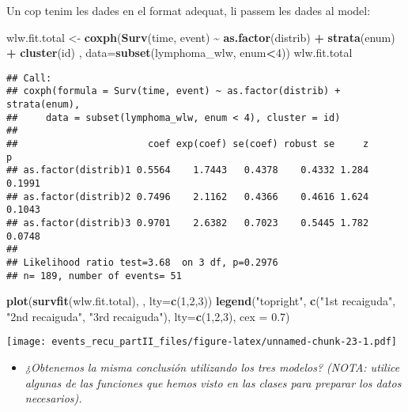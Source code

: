 \documentclass[
]{article}
\newenvironment{Shaded}{\begin{snugshade}}{\end{snugshade}}
\newcommand{\AttributeTok}[1]{\textcolor[rgb]{0.13,0.29,0.53}{#1}}
\newcommand{\DecValTok}[1]{\textcolor[rgb]{0.00,0.00,0.81}{#1}}
\newcommand{\FloatTok}[1]{\textcolor[rgb]{0.00,0.00,0.81}{#1}}
\newcommand{\FunctionTok}[1]{\textcolor[rgb]{0.13,0.29,0.53}{\textbf{#1}}}
\newcommand{\NormalTok}[1]{#1}
\newcommand{\OtherTok}[1]{\textcolor[rgb]{0.56,0.35,0.01}{#1}}
\newcommand{\SpecialCharTok}[1]{\textcolor[rgb]{0.81,0.36,0.00}{\textbf{#1}}}
\newcommand{\StringTok}[1]{\textcolor[rgb]{0.31,0.60,0.02}{#1}}
\providecommand{\tightlist}{%
  \setlength{\itemsep}{0pt}\setlength{\parskip}{0pt}}
\begin{document}
Un cop tenim les dades en el format adequat, li passem les dades al
model:

\begin{Shaded}
\begin{Highlighting}[]
\NormalTok{wlw.fit.total }\OtherTok{\textless{}{-}} \FunctionTok{coxph}\NormalTok{(}\FunctionTok{Surv}\NormalTok{(time, event) }\SpecialCharTok{\textasciitilde{}} \FunctionTok{as.factor}\NormalTok{(distrib) }\SpecialCharTok{+} \FunctionTok{strata}\NormalTok{(enum) }\SpecialCharTok{+}
                  \FunctionTok{cluster}\NormalTok{(id) , }\AttributeTok{data=}\FunctionTok{subset}\NormalTok{(lymphoma\_wlw, enum}\SpecialCharTok{\textless{}}\DecValTok{4}\NormalTok{))}
\NormalTok{wlw.fit.total}
\end{Highlighting}
\end{Shaded}

\begin{verbatim}
## Call:
## coxph(formula = Surv(time, event) ~ as.factor(distrib) + strata(enum), 
##     data = subset(lymphoma_wlw, enum < 4), cluster = id)
## 
##                       coef exp(coef) se(coef) robust se     z      p
## as.factor(distrib)1 0.5564    1.7443   0.4378    0.4332 1.284 0.1991
## as.factor(distrib)2 0.7496    2.1162   0.4366    0.4616 1.624 0.1043
## as.factor(distrib)3 0.9701    2.6382   0.7023    0.5445 1.782 0.0748
## 
## Likelihood ratio test=3.68  on 3 df, p=0.2976
## n= 189, number of events= 51
\end{verbatim}

\begin{Shaded}
\begin{Highlighting}[]
\FunctionTok{plot}\NormalTok{(}\FunctionTok{survfit}\NormalTok{(wlw.fit.total), , }\AttributeTok{lty=}\FunctionTok{c}\NormalTok{(}\DecValTok{1}\NormalTok{,}\DecValTok{2}\NormalTok{,}\DecValTok{3}\NormalTok{)) }
\FunctionTok{legend}\NormalTok{(}\StringTok{"topright"}\NormalTok{, }\FunctionTok{c}\NormalTok{(}\StringTok{"1st recaiguda"}\NormalTok{, }\StringTok{"2nd recaiguda"}\NormalTok{, }\StringTok{"3rd recaiguda"}\NormalTok{), }\AttributeTok{lty=}\FunctionTok{c}\NormalTok{(}\DecValTok{1}\NormalTok{,}\DecValTok{2}\NormalTok{,}\DecValTok{3}\NormalTok{), }\AttributeTok{cex =} \FloatTok{0.7}\NormalTok{)}
\end{Highlighting}
\end{Shaded}

\texttt{[image: events\_recu\_partII\_files/figure-latex/unnamed-chunk-23-1.pdf]}

\begin{itemize}
\tightlist
\item
  \emph{¿Obtenemos la misma conclusión utilizando los tres modelos?
  (NOTA: utilice algunas de las funciones que hemos visto en las clases
  para preparar los datos necesarios).}
\end{itemize}
\end{document}
